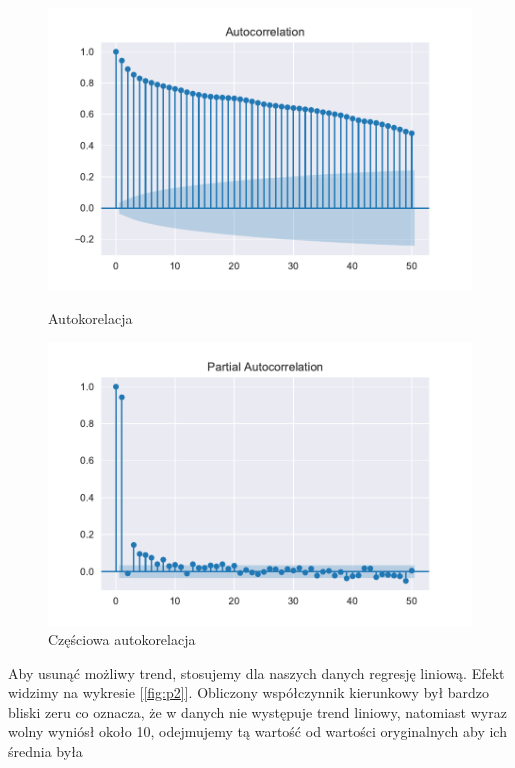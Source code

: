 \documentclass{article}
\theoremstyle{break}
\begin{document}
	\begin{figure}[H]
	\begin{center}
		\begin{minipage}{0.49\linewidth}
			\centering
			\includegraphics[scale=0.49]{acf1.pdf}
			\caption{Autokorelacja}
			\label{fig:acf1}
		\end{minipage}
		\begin{minipage}{0.49\linewidth}
			\centering
			\includegraphics[scale=0.49]{pacf1.pdf}
			\caption{Częściowa autokorelacja}
			\label{fig:pacf1}
		\end{minipage}
	\end{center}
\end{figure}

Aby usunąć możliwy trend, stosujemy dla naszych danych regresję liniową. Efekt widzimy na wykresie [\ref*{fig:p2}]. Obliczony współczynnik kierunkowy był bardzo bliski zeru co oznacza, że w danych nie występuje trend liniowy, natomiast wyraz wolny wyniósł około 10, odejmujemy tą wartość od wartości oryginalnych aby ich średnia była 
\end{document}
